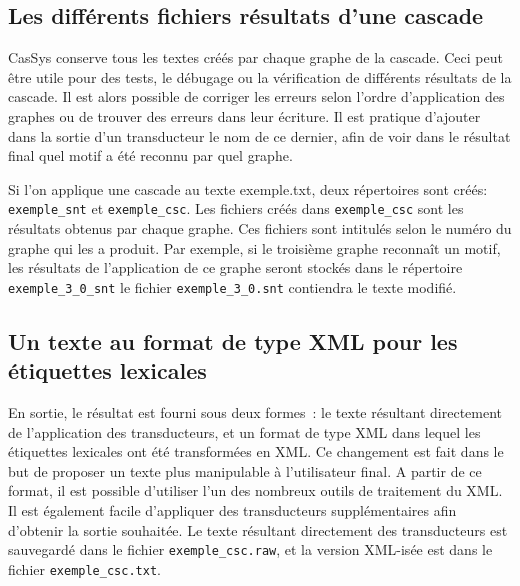\subsection{Les différents fichiers résultats d'une cascade}

CasSys conserve tous les textes créés par chaque graphe  de la cascade. Ceci peut être
utile  pour des tests, le débugage ou la vérification de différents résultats de la cascade. Il est
alors possible de corriger les erreurs selon l'ordre d'application des graphes ou de trouver des
erreurs dans leur écriture. Il est pratique d'ajouter dans la sortie d'un transducteur le nom de ce
dernier, afin de voir dans le résultat final quel motif a été reconnu par quel graphe.

Si l'on applique une cascade au texte exemple.txt, deux répertoires sont créés:
\verb+exemple_snt+ et \verb+exemple_csc+.
Les fichiers créés dans \verb+exemple_csc+ sont les résultats obtenus par
chaque graphe. Ces fichiers sont intitulés selon le numéro du graphe qui les a produit. Par exemple, si le
troisième graphe reconnaît un motif, les résultats de l'application de ce graphe seront stockés dans le 
répertoire  \verb+exemple_3+\newline\verb+_0_snt+ le fichier \verb+exemple_3_0.snt+ contiendra le texte modifié.

\subsection{Un texte au format de type XML pour les étiquettes lexicales}

En sortie, le résultat est fourni sous deux formes~: le texte résultant directement de l'application des transducteurs, et un format de type XML dans lequel les étiquettes lexicales ont été transformées en XML.
Ce changement est fait dans le but de proposer un texte plus manipulable  à l'utilisateur final.
A partir de ce format, il est possible d'utiliser l'un des nombreux outils de traitement du XML.
Il est également facile d'appliquer des transducteurs supplémentaires afin d'obtenir la sortie souhaitée.
Le texte résultant directement des transducteurs est sauvegardé dans le fichier  \verb+exemple_csc.raw+, et la version  XML-isée est dans le fichier \verb+exemple_csc.txt+.

